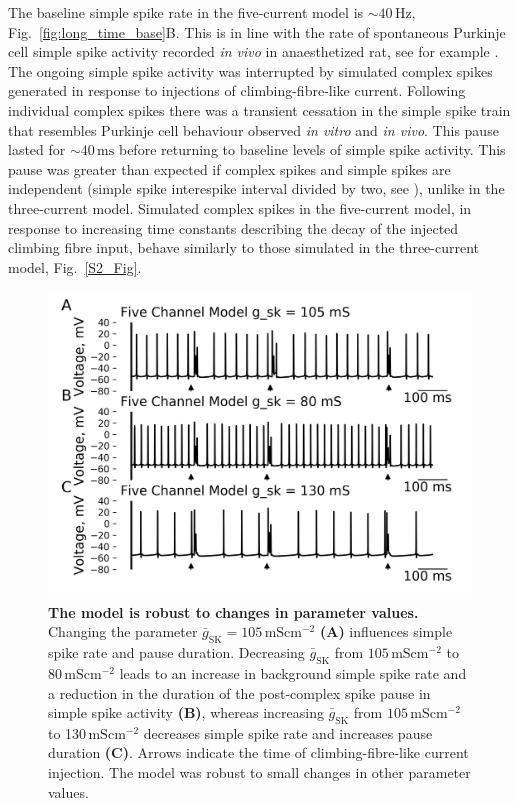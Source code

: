 \documentclass[twocolumn]{svjour3}          %
\newcommand{\msi}{\,\mathrm{mS cm^{-2}}}
\newcommand{\mse}{\,\mathrm{ms}}
\newcommand{\hz}{\,\mathrm{Hz}}
\newcommand{\sk}{\mathrm{SK}}
\begin{document}
The baseline simple spike rate in the five-current model is $\sim
40\hz$, Fig.~\ref{fig:long_time_base}B. This is in line with the rate
of spontaneous Purkinje cell simple spike activity recorded \textit{in
  vivo} in anaesthetized rat, see for example
\citet{BurroughsEtAl2016}.  The ongoing simple spike activity was
interrupted by simulated complex spikes generated in response to
injections of climbing-fibre-like current. Following individual
complex spikes there was a transient cessation in the simple spike
train that resembles Purkinje cell behaviour observed \textit{in
  vitro} and \textit{in vivo}. This pause lasted for $\sim 40\mse$
before returning to baseline levels of simple spike activity. This
pause was greater than expected if complex spikes and simple spikes
are independent (simple spike interespike interval divided by two, see
\citet{XiaoEtAl2014}), unlike in the three-current model. Simulated
complex spikes in the five-current model, in response to increasing
time constants describing the decay of the injected climbing fibre
input, behave similarly to those simulated in the three-current model,
Fig.~\ref{S2_Fig}.

\begin{figure}[!ht]
  \includegraphics[width=\linewidth]{Figure7.png}
\caption{\textbf{The model is robust to changes in parameter values.}
 Changing the parameter $\bar{g}_\sk=105\msi$ \textbf{(A)} influences simple
  spike rate and pause duration. Decreasing $\bar{g}_\sk$ from
  $105\msi$ to 80$\msi$ leads to an increase in background simple spike
  rate and a reduction in the duration of the post-complex spike pause
  in simple spike activity \textbf{(B)}, whereas increasing
  $\bar{g}_\sk$ from $105\msi$ to 130$\msi$ decreases simple spike rate
  and increases pause duration \textbf{(C)}. Arrows indicate the time
  of climbing-fibre-like current injection. The model was robust to
  small changes in other parameter values.}
\label{S3_Fig}
\end{figure}
\end{document}
